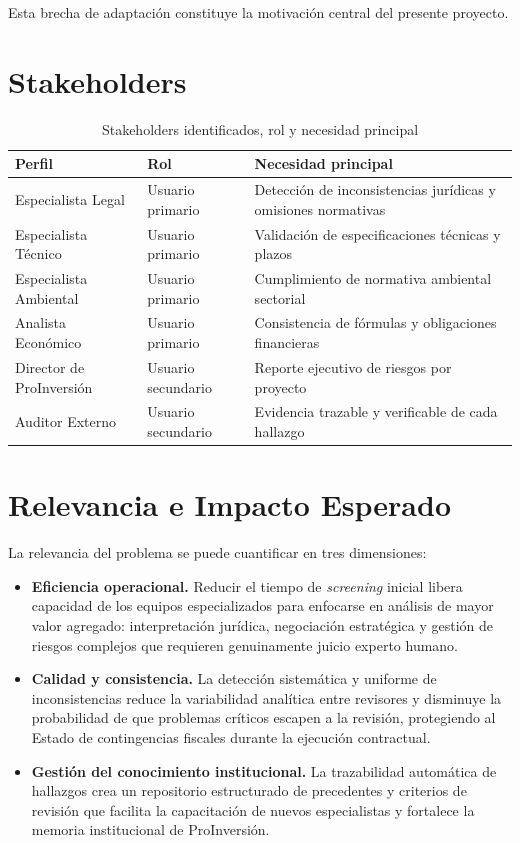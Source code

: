 Esta brecha de adaptación constituye la motivación central del presente proyecto.

\section{Stakeholders}

\begin{table}[H]
\centering
\caption{Stakeholders identificados, rol y necesidad principal}
\label{tab:stakeholders}
\begin{tabular}{p{4cm}p{3.5cm}p{6cm}}
\toprule
\textbf{Perfil} & \textbf{Rol} & \textbf{Necesidad principal} \\
\midrule
Especialista Legal      & Usuario primario   & Detección de inconsistencias jurídicas y omisiones normativas \\
Especialista Técnico    & Usuario primario   & Validación de especificaciones técnicas y plazos \\
Especialista Ambiental  & Usuario primario   & Cumplimiento de normativa ambiental sectorial \\
Analista Económico      & Usuario primario   & Consistencia de fórmulas y obligaciones financieras \\
Director de ProInversión & Usuario secundario & Reporte ejecutivo de riesgos por proyecto \\
Auditor Externo         & Usuario secundario & Evidencia trazable y verificable de cada hallazgo \\
\bottomrule
\end{tabular}
\end{table}

\section{Relevancia e Impacto Esperado}

La relevancia del problema se puede cuantificar en tres dimensiones:

\begin{itemize}
    \item \textbf{Eficiencia operacional.} Reducir el tiempo de \textit{screening}
    inicial libera capacidad de los equipos especializados para enfocarse en análisis
    de mayor valor agregado: interpretación jurídica, negociación estratégica y
    gestión de riesgos complejos que requieren genuinamente juicio experto humano.
    \item \textbf{Calidad y consistencia.} La detección sistemática y uniforme de
    inconsistencias reduce la variabilidad analítica entre revisores y disminuye la
    probabilidad de que problemas críticos escapen a la revisión, protegiendo al Estado
    de contingencias fiscales durante la ejecución contractual.
    \item \textbf{Gestión del conocimiento institucional.} La trazabilidad automática
    de hallazgos crea un repositorio estructurado de precedentes y criterios de
    revisión que facilita la capacitación de nuevos especialistas y fortalece la
    memoria institucional de ProInversión.
\end{itemize}

